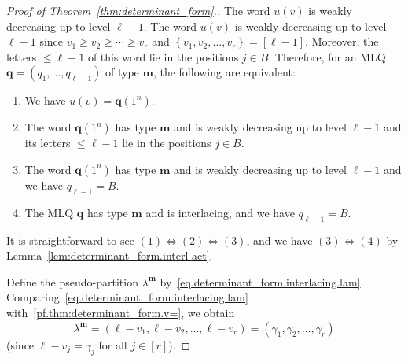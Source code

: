 \documentclass[reqno]{amsart}
\newcommand{\0}{\phantom{c}}
\newcommand{\mm}{\mathbf{m}}
\newcommand{\qq}{\mathbf{q}}
\newcommand{\mcW}{\mathcal{W}}
\newenvironment{verlong}{}{}
\newenvironment{vershort}{}{}
\newcommand{\set}[1]{\left\{ #1 \right\}}
\newcommand{\tup}[1]{\left( #1 \right)}
\newcommand{\ive}[1]{\left[ #1 \right]}
\theoremstyle{plain}
\theoremstyle{definition}
\numberwithin{equation}{section}
\begin{document}
\begin{proof}[Proof of Theorem~\ref{thm:determinant_form}.]
\begin{vershort}
The word $u(v)$ is weakly decreasing up to level $\ell-1$.
\end{vershort}
\begin{verlong}
The word $u(v)$ is weakly decreasing up to level $\ell-1$ since $v_1 \geq v_2 \geq \cdots \geq v_r$ and $\set{v_1, v_2, \ldots, v_r} = \ive{\ell-1}$.
\end{verlong}
Moreover, the letters $\leq \ell-1$ of this word lie in the positions $j \in B$.
Therefore, for an MLQ $\qq = \tup{q_1, \ldots, q_{\ell-1}}$ of type $\mm$, the following are equivalent:
\begin{enumerate}
\item We have $u(v) = \qq(1^n)$.
\item The word $\qq(1^n)$ has type $\mm$ and is weakly decreasing up to level $\ell-1$ and its letters $\leq \ell-1$ lie in the positions $j \in B$.
\item The word $\qq(1^n)$ has type $\mm$ and is weakly decreasing up to level $\ell-1$ and we have $q_{\ell-1} = B$.
\item The MLQ $\qq$ has type $\mm$ and is interlacing, and we have $q_{\ell-1} = B$.
\end{enumerate}
It is straightforward to see $(1) \Longleftrightarrow (2) \Longleftrightarrow (3)$, and we have $(3) \Longleftrightarrow (4)$ by Lemma~\ref{lem:determinant_form.interl-act}.

Define the pseudo-partition $\lambda^{\mm}$ by~\eqref{eq.determinant_form.interlacing.lam}.
Comparing~\eqref{eq.determinant_form.interlacing.lam} with~\eqref{pf.thm:determinant_form.v=}, we obtain
\[
\lambda^{\mm} = \tup{\ell-v_1, \ell-v_2, \dotsc, \ell-v_r}
= \tup{\gamma_1, \gamma_2, \ldots, \gamma_r}
\]
(since $\ell - v_j = \gamma_j$ for all $j \in \ive{r}$).


\end{proof}
\end{document}
